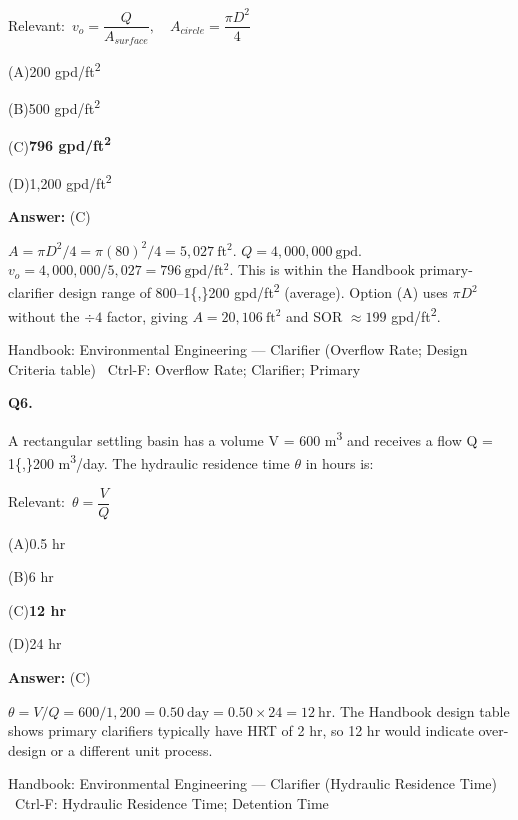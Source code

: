 \documentclass[11pt]{article}
\newcommand{\correct}[1]{\textbf{#1}\;{\color{accent}$\checkmark$}}
\newcommand{\optline}[2]{\par\noindent\hspace{1.2em}(#1)\hspace{0.6em}#2}
\begin{document}
{\small\color{soft}Relevant:}\ $v_o = \dfrac{Q}{A_{surface}},\quad A_{circle} = \dfrac{\pi D^2}{4}$\par\vspace{3pt}
\optline{A}{200 gpd/ft\textsuperscript{2}}
\optline{B}{500 gpd/ft\textsuperscript{2}}
\optline{C}{\correct{796 gpd/ft\textsuperscript{2}}}
\optline{D}{1,200 gpd/ft\textsuperscript{2}}
\par\vspace{3pt}
\vspace{2pt}\par\noindent\colorbox{boxbg}{\parbox{\dimexpr\linewidth-2\fboxsep\relax}{%
\vspace{2pt}\textbf{Answer:} (C)\par\vspace{2pt}
{\small $A = \pi D^2/4 = \pi(80)^2/4 = 5{,}027\ \mathrm{ft^2}$.  $Q = 4{,}000{,}000\ \mathrm{gpd}$.  $v_o = 4{,}000{,}000/5{,}027 = 796\ \mathrm{gpd/ft^2}$. This is within the Handbook primary-clarifier design range of 800--1\{,\}200 gpd/ft\textsuperscript{2} (average). Option (A) uses $\pi D^2$ without the $\div 4$ factor, giving $A = 20{,}106\ \mathrm{ft^2}$ and SOR $\approx 199$ gpd/ft\textsuperscript{2}.}\par\vspace{2pt}
{\footnotesize\color{soft}Handbook: Environmental Engineering --- Clarifier (Overflow Rate; Design Criteria table) \textbullet\ Ctrl-F: Overflow Rate; Clarifier; Primary}\vspace{2pt}
}}
\vspace{9pt}
\filbreak
\textbf{\color{accent}Q6.}\par\vspace{2pt}
A rectangular settling basin has a volume V = 600 m\textsuperscript{3} and receives a flow Q = 1\{,\}200 m\textsuperscript{3}/day. The hydraulic residence time $\theta$ in hours is:\par\vspace{3pt}
{\small\color{soft}Relevant:}\ $\theta = \dfrac{V}{Q}$\par\vspace{3pt}
\optline{A}{0.5 hr}
\optline{B}{6 hr}
\optline{C}{\correct{12 hr}}
\optline{D}{24 hr}
\par\vspace{3pt}
\vspace{2pt}\par\noindent\colorbox{boxbg}{\parbox{\dimexpr\linewidth-2\fboxsep\relax}{%
\vspace{2pt}\textbf{Answer:} (C)\par\vspace{2pt}
{\small $\theta = V/Q = 600/1{,}200 = 0.50\ \mathrm{day} = 0.50\times 24 = 12\ \mathrm{hr}$. The Handbook design table shows primary clarifiers typically have HRT of 2 hr, so 12 hr would indicate over-design or a different unit process.}\par\vspace{2pt}
{\footnotesize\color{soft}Handbook: Environmental Engineering --- Clarifier (Hydraulic Residence Time) \textbullet\ Ctrl-F: Hydraulic Residence Time; Detention Time}\vspace{2pt}
}}
\end{document}
